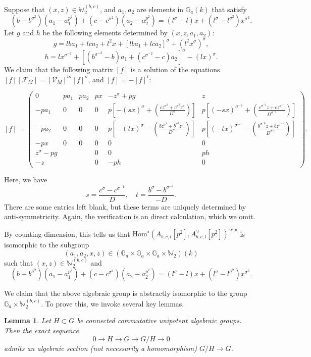 \documentclass[a4paper,12pt,twoside]{report}
\newtheorem{lemma}[theorem]{Lemma}
\newcommand{\G}{\mathbb{G}}
\newcommand{\Hom}{\mathrm{Hom}}
\newcommand{\W}{\mathbb{W}}
\newcommand{\sym}{\mathrm{sym}}
\begin{document}
Suppose that $(x,z)\in \W_2^{(b,c)}$, and $a_{1},a_{2}$ are elements in $\G_a(k)$ that satisfy 
\[(b-b^{\sigma^2})(a_{1}-a_{1}^{p^2})+(c-c^{\sigma^2})(a_{2}-a_{2}^{p^2})=(l^\sigma-l)x+(l^\sigma-l^{\sigma^2})x^{\sigma^2}.\]
Let $g$ and $h$ be the following elements determined by $(x,z,a_{1},a_{2})$:
\[g=lba_{1}+lca_{2}+l^2x+[lba_{1}+lca_{2}]^\sigma+(l^2x^\sigma)^\sigma,\]
\[h=lx^{\sigma^{-1}}+[(b^{\sigma^{-2}}-b)a_{1}+(c^{\sigma^{-2}}-c)a_{2}]^\sigma-(lx)^\sigma.\]
We claim that the following matrix $[f]$ 
is a solution of the equations $[f][\mathcal{F}_M]=[\mathcal{V}_M]^{t\sigma}[f]^\sigma$, and $[f]=-[f]^t$:
\begin{small}
\[[f]=\left(\begin{matrix}
    0&pa_{1}&pa_{2}&px&-z^\sigma+pg&z\\
    -pa_{1}&0&0&0&p[-(sx)^\sigma+(\frac{cz^{\sigma^2}+c^{\sigma^2}z^{\sigma}}{D^\sigma})]&p[(-sx)^{\sigma^{-1}}+(\frac{c^{\sigma^{-2}}z+cz^{\sigma^{-1}}}{D^{\sigma^{-1}}})]\\
    -pa_{2}&0&0&0&p[-(tx)^\sigma-(\frac{bz^{\sigma^2}+b^{\sigma^2}z^\sigma}{D^\sigma})]&p[(-tx)^{\sigma^{-1}}-(\frac{b^{\sigma^{-2}}z+bz^{\sigma^{-1}}}{D^{\sigma^{-1}}})]\\
    -px&0&0&0&0&0\\
    z^{\sigma}-pg&&&0&0&ph\\
    -z&&&0&-ph&0
\end{matrix}\right).\]
\end{small} 
Here, we have \[ s=\frac{c^{\sigma}-c^{\sigma^{-1}}}{D},\quad t=\frac{b^{\sigma}-b^{\sigma^{-1}}}{-D}.\]
There are some entries left blank, but these terms are uniquely determined by anti-symmetricity. 
Again, the verification is an direct calculation, which we omit. 

By counting dimension, this tells us that $\Hom^{\circ}(A_{b,c,l}[p^2],A_{b,c,l}^{\vee}[p^2])^{\sym}$ 
is isomorphic to the subgroup \[(a_{1},a_{2},x,z)\in (\G_a\times\G_a\times \G_a\times \W_2)(k)\] 
such that $(x,z)\in \W_2^{(b,c)}$ and 
\[(b-b^{\sigma^2})(a_{1}-a_{1}^{p^2})+(c-c^{\sigma^2})(a_{2}-a_{2}^{p^2})=(l^\sigma-l)x+(l^\sigma-l^{\sigma^2})x^{\sigma^2}.\]

We claim that the above algebraic group is abstractly isomorphic to the group $\G_a\times \W_2^{(b,c)}$. 
To prove this, we invoke several key lemmas. 

\begin{lemma}\label{sectionlemma}
    Let $H\subset G$ be connected commutative unipotent algebraic groups.
Then the exact sequence
    \[0\rightarrow H \rightarrow G \rightarrow G/H\rightarrow 0\]
    admits an algebraic section (not necessarily a homomorphism) $G/H\rightarrow G$. 
\end{lemma}
\end{document}
